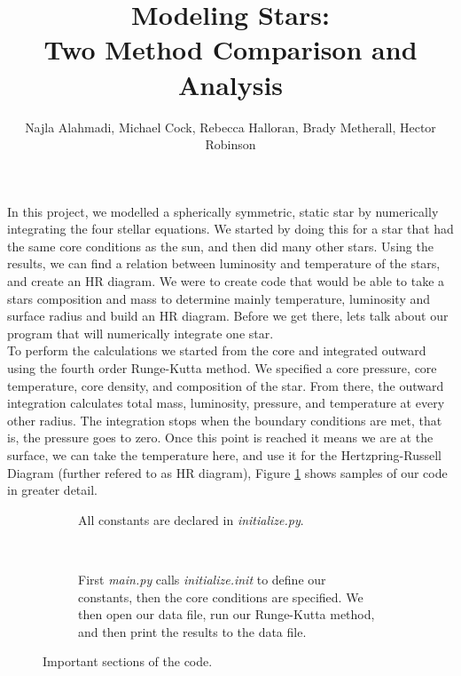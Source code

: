 \documentclass[10pt]{article}
\title{Modeling Stars: \\ Two Method Comparison and Analysis}
\author{Najla Alahmadi, Michael Cock, Rebecca Halloran, Brady Metherall, Hector Robinson}
\begin{document}
\maketitle

\lstset{style=mystyle}

In this project, we modelled a spherically symmetric, static star by numerically integrating the four stellar equations. We started by doing this for a star that had the same core conditions as the sun, and then did many other stars. Using the results, we can find a relation between luminosity and temperature of the stars, and create an HR diagram. We were to create code that would be able to take a stars composition and mass to determine mainly temperature, luminosity and surface radius and build an HR diagram. Before we get there, lets talk about our program that will numerically integrate one star. \\

To perform the calculations we started from the core and integrated outward using the fourth order Runge-Kutta method. We specified a core pressure, core temperature, core density, and composition of the star. From there, the outward integration calculates total mass, luminosity, pressure, and temperature at every other radius. The integration stops when the boundary conditions are met, that is, the pressure goes to zero. Once this point is reached it means we are at the surface, we can take the temperature here, and use it for the Hertzpring-Russell Diagram (further refered to as HR diagram), Figure \ref{fig:code} shows samples of our code in greater detail. \\

\begin{figure}[htbp]
 \begin{subfigure}{\textwidth}
  
  \caption{All constants are declared in \emph{initialize.py}.}
 \end{subfigure} \\
 \begin{subfigure}{\textwidth}
  
  
  
  \caption{First \emph{main.py} calls \emph{initialize.init} to define our constants, then the core conditions are specified. We then open our data file, run our Runge-Kutta method, and then print the results to the data file.}
 \end{subfigure}
 \caption{Important sections of the code.}
 \label{fig:code}
\end{figure}
\end{document}
